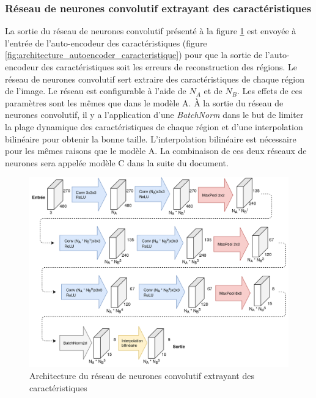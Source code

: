 \subsubsection{Réseau de neurones convolutif extrayant des caractéristiques}
    La sortie du réseau de neurones convolutif présenté à la figure \ref{fig:architecture_small_cnn} est envoyée à l'entrée de l'auto-encodeur des caractéristiques (figure \ref{fig:architecture_autoencoder_caracteristique}) pour que la sortie de l'auto-encodeur des caractéristiques soit les erreurs de reconstruction des régions. Le réseau de neurones convolutif sert extraire des caractéristiques de chaque région de l'image. Le réseau est configurable à l'aide de \(N_A\) et de \(N_B\). Les effets de ces paramètres sont les mêmes que dans le modèle A. À la sortie du réseau de neurones convolutif, il y a l'application d'une \textit{BatchNorm} dans le but de limiter la plage dynamique des caractéristiques de chaque région et d'une interpolation bilinéaire pour obtenir la bonne taille. L'interpolation bilinéaire est nécessaire pour les mêmes raisons que le modèle A. La combinaison de ces deux réseaux de neurones sera appelée modèle C dans la suite du document.
    \begin{figure}[H]
        \centering
        \includegraphics[width=17cm]{images/Architecture_SmallCnnWithAutoencoder.png}
        \caption{Architecture du réseau de neurones convolutif extrayant des caractéristiques}
        \label{fig:architecture_small_cnn}
    \end{figure}

